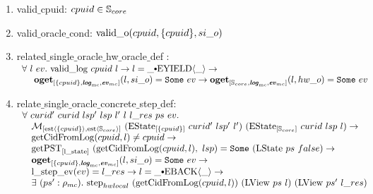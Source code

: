 \begin{figure}
\noindent{}

\begin{enumerate}
\item valid$\_$cpuid: $cpuid \in {\mathbb{S}_{core}}$
\item valid$\_$oracle$\_$cond: ${\mathrm{valid}\_\mathrm{o}}({cpuid}, {\{cpuid\}}, {si\_o})$
\item related$\_$single$\_$oracle$\_$hw$\_$oracle$\_$def : \\
$
\begin{array}{l}
\forall \ l \ ev  . \ \validlog{cpuid}{l} \rightarrow l = \listconsoppo{\yieldev{\_}}{\_} \rightarrow\\
\ \ \ \ \oget{\set{cpuid}}{\mclog}{\mcevent}{l}{si\_o}{ev} \rightarrow \oget{\coreset}{\mclog}{\mcevent}{l}{hw\_o}{ev} \\
\end{array}
$
\item relate$\_$single$\_$oracle$\_$concrete$\_$step$\_$def: \\ 
$
\begin{array}{l}
\forall \ curid' \ curid \ lsp' \ lsp \ l' \ l \ l\_res \ ps \ ev  . \\
\ \ \ \matchestateestate{\set{cpuid}}{(\envstate{\set{cpuid}}{curid'}{lsp'}{l'})}{(\envstate{\coreset}{curid}{lsp}{l})} \rightarrow\\
\ \ \ \getcuridfromlognoeq{cpuid}{l} \neq cpuid \rightarrow \\
\ \ \ \getpstsome{\localstatekwd}{\getcuridfromlognoeq{cpuid}{l}}{lsp}{(\localstate{ps}{false})} \rightarrow \\
\ \ \ \oget{\set{cpuid}}{\mclog}{\mcevent}{l}{si\_o}{ev} \rightarrow \\
\ \ \ \localstepev{ev}{l\_res} \rightarrow l = \listconsoppo{\yieldbackev{\_}}{\_} \rightarrow \\
\ \ \ \exists\ (ps' : \privatestate) . \ \hardwarelocalstep{(\getcuridfromlognoeq{cpuid}{l})}{(\localview{ps}{l})}{(\localview{ps'}{l\_res})} \\
\end{array}
$
\end{enumerate}


\noindent{}


\end{figure}
